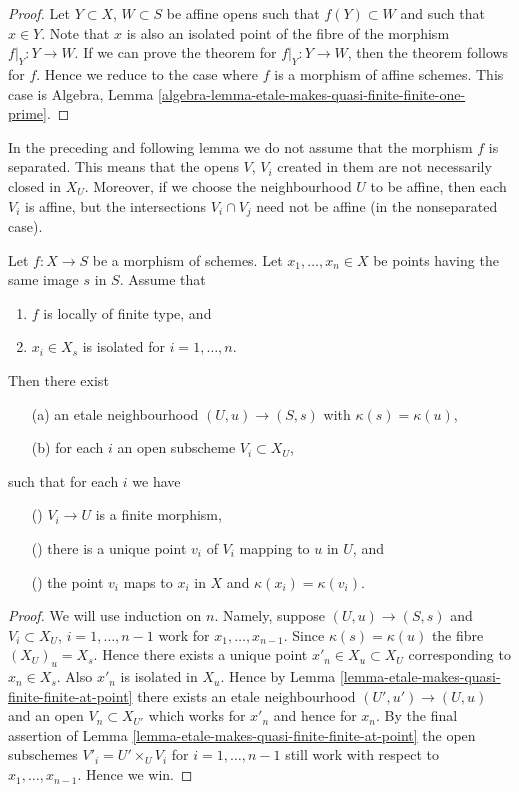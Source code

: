 \begin{proof}
Let $Y \subset X$, $W \subset S$ be affine opens such that
$f(Y) \subset W$ and such that $x \in Y$. Note that $x$ is
also an isolated point of the fibre of the morphism $f|_Y : Y \to W$.
If we can prove the theorem for $f|_Y : Y \to W$, then the
theorem follows for $f$. Hence we reduce to the case where
$f$ is a morphism of affine schemes. This case is
Algebra, Lemma \ref{algebra-lemma-etale-makes-quasi-finite-finite-one-prime}.
\end{proof}

\noindent
In the preceding and following lemma we do not assume that the morphism
$f$ is separated. This means that the opens $V$, $V_i$ created
in them are not necessarily closed in $X_U$. Moreover, if we choose
the neighbourhood $U$ to be affine, then each $V_i$ is affine, but
the intersections $V_i \cap V_j$ need not be affine (in the nonseparated
case).

\begin{lemma}
\label{lemma-etale-makes-quasi-finite-finite-multiple-points}
Let $f : X \to S$ be a morphism of schemes.
Let $x_1, \ldots, x_n \in X$ be points having the same image $s$ in $S$.
Assume that
\begin{enumerate}
\item $f$ is locally of finite type, and
\item $x_i \in X_s$ is isolated for $i = 1, \ldots, n$.
\end{enumerate}
Then there exist
\begin{enumerate}
\item[(a)] an etale neighbourhood $(U, u) \to (S, s)$
with $\kappa(s) = \kappa(u)$,
\item[(b)] for each $i$ an open subscheme $V_i \subset X_U$,
\end{enumerate}
such that for each $i$ we have
\begin{enumerate}
\item[(\romannumeral1)] $V_i \to U$ is a finite morphism,
\item[(\romannumeral2)] there is a unique point $v_i$ of $V_i$
mapping to $u$ in $U$, and
\item[(\romannumeral3)] the point $v_i$ maps to $x_i$ in $X$ and
$\kappa(x_i) = \kappa(v_i)$.
\end{enumerate}
\end{lemma}

\begin{proof}
We will use induction on $n$.
Namely, suppose $(U,u) \to (S, s)$ and $V_i \subset X_U$,
$i = 1, \ldots, n - 1$ work for $x_1, \ldots, x_{n - 1}$. Since
$\kappa(s) = \kappa(u)$ the fibre $(X_U)_u = X_s$. Hence there
exists a unique point $x'_n \in X_u \subset X_U$ corresponding to
$x_n \in X_s$. Also $x'_n$ is isolated in $X_u$. Hence by
Lemma \ref{lemma-etale-makes-quasi-finite-finite-at-point} there
exists an etale neighbourhood $(U', u') \to (U, u)$
and an open $V_n \subset X_{U'}$ which works for $x'_n$ and hence
for $x_n$.
By the final assertion of
Lemma \ref{lemma-etale-makes-quasi-finite-finite-at-point}
the open subschemes $V'_i = U'\times_U V_i$ for $i = 1, \ldots, n - 1$ still
work with respect to $x_1, \ldots, x_{n - 1}$. Hence we win.
\end{proof}

